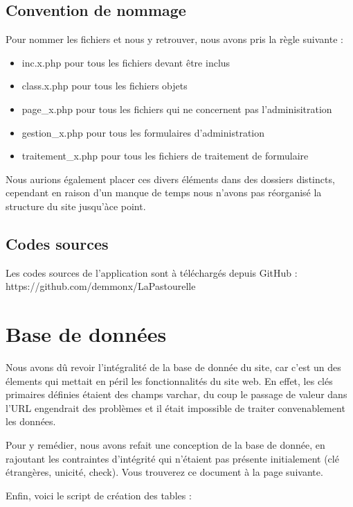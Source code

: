\documentclass[11pt]{report}
\begin{document}
 \subsection{Convention de nommage}
 Pour nommer les fichiers et nous y retrouver, nous avons pris la règle suivante
 : 
 \begin{itemize}
   \item inc.x.php pour tous les fichiers devant être inclus
   \item class.x.php pour tous les fichiers objets
   \item page\_x.php pour tous les fichiers qui ne concernent pas
   l'adminisitration
   \item gestion\_x.php pour tous les formulaires d'administration
   \item traitement\_x.php pour tous les fichiers de traitement de formulaire \\
 \end{itemize}
 
 \par Nous aurions également placer ces divers éléments dans des dossiers
 distincts, cependant en raison d'un manque de temps nous n'avons pas réorganisé
 la structure du site jusqu'àce point.
 
 \subsection{Codes sources}
 Les codes sources de l'application sont à téléchargés depuis GitHub :
 https://github.com/demmonx/LaPastourelle

\section{Base de données}
Nous avons dû revoir l'intégralité de la base de donnée du site, car c'est un
des élements qui mettait en péril les fonctionnalités du site web. En effet, les
clés primaires définies étaient des champs varchar, du coup le passage de valeur
dans l'URL engendrait des problèmes et il était impossible de traiter
convenablement les données. \\

\par Pour y remédier, nous avons refait une conception de la base de donnée, en
rajoutant les contraintes d'intégrité qui n'étaient pas présente initialement
(clé étrangères, unicité, check). Vous trouverez ce document à la page suivante.


 
 
 \begin{multicols}{2}
 
 \par Enfin, voici le script de création des tables :\\

        \end{multicols}
        
\end{document}
